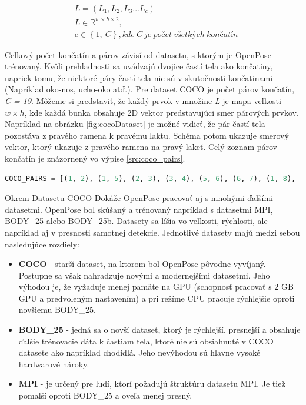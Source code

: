 \documentclass[slovak,master,dept460,male,cpp,cpdeclaration]{diploma}
\begin{document}
\begin{eqnarray}
& L = (L_{1}, L_{2}, L_{3} ... L_{c}) \label{eq:pafmap}\\
& L\in\mathbb{R}^{w \times  h \times 2},\nonumber\\
& c\in \left \{1,\: C  \right \}, kde\: C\: je\: počet\: všetkých\: končatín\nonumber
\end{eqnarray}

Celkový počet končatín a párov závisí od datasetu, s ktorým je OpenPose trénovaný. Kvôli prehľadnosti sa uvádzajú dvojice častí tela ako končatiny, napriek tomu, že niektoré páry častí tela nie sú v skutočnosti končatinami (Napríklad oko-nos, ucho-oko atď.). Pre dataset COCO je počet párov končatín, \textit{C = 19}. Môžeme si predstaviť, že každý prvok v množine \textit{L} je mapa veľkosti \textit{$w\times h$}, kde každá bunka obsahuje 2D vektor predstavujúci smer párových prvkov. Napríklad na obrázku \ref{fig:cocoDataset} je možné vidieť, že pár častí tela pozostáva z pravého ramena k pravému laktu. Schéma potom ukazuje smerový vektor, ktorý ukazuje z pravého ramena na pravý lakeť. Celý zoznam párov končatín je znázornený vo výpise \ref{src:coco_pairs}.\bigskip

\begin{lstlisting}[language=Python,label=src:coco_pairs,caption={Množina párov končatín v datasete COCO}]
COCO_PAIRS = [(1, 2), (1, 5), (2, 3), (3, 4), (5, 6), (6, 7), (1, 8), (8, 9), (9, 10), (1, 11), (11, 12), (12, 13), (1, 0), (0, 14), (14, 16), (0, 15), (15, 17), (2, 16), (5, 17)]
\end{lstlisting}

\bigskip
Okrem Datasetu COCO Dokáže OpenPose pracovať aj s mnohými ďalšími datasetmi. OpenPose bol skúšaný a trénovaný napríklad s datasetmi MPI\cite{andriluka14cvpr}, BODY\_25 alebo BODY\_25b. Datasety sa líšia vo veľkosti, rýchlosti, ale napríklad  aj v presnosti samotnej detekcie. Jednotlivé datasety majú medzi sebou nasledujúce rozdiely:


\begin{itemize}
\item \textbf{COCO} - starší dataset, na ktorom bol OpenPose pôvodne vyvíjaný. Postupne sa však nahradzuje novými a modernejšími datasetmi. Jeho výhodou je, že vyžaduje menej pamäte na GPU (schopnosť pracovať s 2 GB GPU a predvoleným nastavením) a pri režíme CPU pracuje rýchlejšie oproti novšiemu BODY\_25.

\item \textbf{BODY\_25} - jedná sa o novší dataset, ktorý je rýchlejší, presnejší a obsahuje ďalšie trénovacie dáta k častiam tela, ktoré nie sú obsiahnuté v COCO datasete ako napríklad chodidlá. Jeho nevýhodou sú hlavne vysoké hardwarové nároky.

\item \textbf{MPI} - je určený pre ľudí, ktorí požadujú štruktúru datasetu MPI. Je tiež pomalší oproti BODY\_25 a oveľa menej presný.
\end{itemize}
\end{document}
